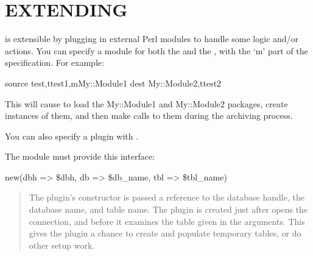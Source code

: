 \documentclass[letterpaper,10pt,english]{sphinxmanual}
\begin{document}
\section{EXTENDING}
\label{\detokenize{mariadb-archiver:extending}}
\sphinxAtStartPar
{} is extensible by plugging in external Perl modules to handle some
logic and/or actions.  You can specify a module for both the {\hyperref[\detokenize{mariadb-archiver:cmdoption-mariadb-archiver-source}]{}} and
the {\hyperref[\detokenize{mariadb-archiver:cmdoption-mariadb-archiver-dest}]{}}, with the ‘m’ part of the specification.  For example:

\begin{sphinxVerbatim}[commandchars=\\\{\}]
\PYGZhy{}\PYGZhy{}source test,ttest1,mMy::Module1 \PYGZhy{}\PYGZhy{}dest My::Module2,ttest2
\end{sphinxVerbatim}

\sphinxAtStartPar
This will cause  to load the My::Module1 and My::Module2 packages,
create instances of them, and then make calls to them during the archiving
process.

\sphinxAtStartPar
You can also specify a plugin with {\hyperref[\detokenize{mariadb-archiver:cmdoption-mariadb-archiver-plugin}]{}}.

\sphinxAtStartPar
The module must provide this interface:

\sphinxAtStartPar
new(dbh =\textgreater{} \$dbh, db =\textgreater{} \$db\_name, tbl =\textgreater{} \$tbl\_name)
\begin{quote}

\sphinxAtStartPar
The plugin’s constructor is passed a reference to the database handle, the
database name, and table name.  The plugin is created just after 
opens the connection, and before it examines the table given in the arguments.
This gives the plugin a chance to create and populate temporary tables, or do
other setup work.
\end{quote}
\end{document}
